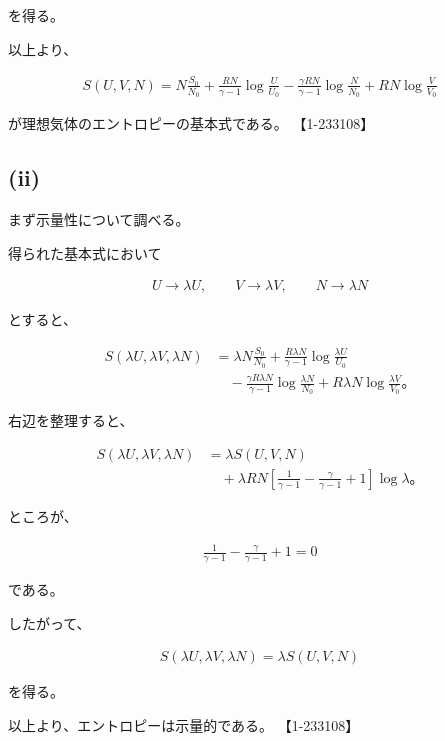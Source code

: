 \documentclass[platex,dvipdfmx,a4paper]{jsarticle}
\begin{document}
を得る。

以上より、

\begin{align*}
S(U,V,N)
=
N\frac{S_0}{N_0}
+
\frac{RN}{\gamma-1}
\log\frac{U}{U_0}
-
\frac{\gamma RN}{\gamma-1}
\log\frac{N}{N_0}
+
RN\log\frac{V}{V_0}
\end{align*}

が理想気体のエントロピーの基本式である。 【1-233108】

\subsection{(ii)}

まず示量性について調べる。

得られた基本式において

\begin{align*}
U\rightarrow \lambda U,
\qquad
V\rightarrow \lambda V,
\qquad
N\rightarrow \lambda N
\end{align*}

とすると、

\begin{align*}
S(\lambda U,\lambda V,\lambda N)
&=
\lambda N\frac{S_0}{N_0}
+
\frac{R\lambda N}{\gamma-1}
\log\frac{\lambda U}{U_0}
\\
&\quad
-
\frac{\gamma R\lambda N}{\gamma-1}
\log\frac{\lambda N}{N_0}
+
R\lambda N
\log\frac{\lambda V}{V_0}。
\end{align*}

右辺を整理すると、

\begin{align*}
S(\lambda U,\lambda V,\lambda N)
&=
\lambda S(U,V,N)
\\
&\quad
+\lambda RN
\left[
\frac{1}{\gamma-1}
-\frac{\gamma}{\gamma-1}
+1
\right]
\log\lambda。
\end{align*}

ところが、

\begin{align*}
\frac{1}{\gamma-1}
-\frac{\gamma}{\gamma-1}
+1
=
0
\end{align*}

である。

したがって、

\begin{align*}
S(\lambda U,\lambda V,\lambda N)
=
\lambda S(U,V,N)
\end{align*}

を得る。

以上より、エントロピーは示量的である。 【1-233108】
\end{document}
